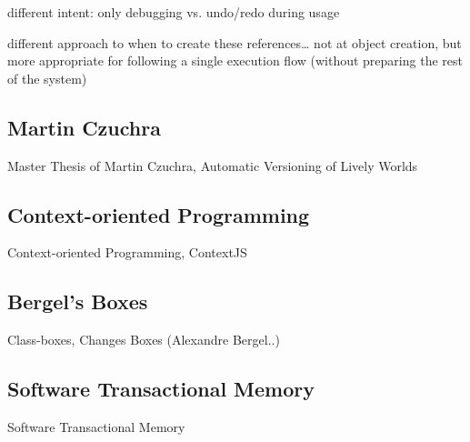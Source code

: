 different intent: only debugging vs. undo/redo during usage

different approach to when to create these references… not at object creation, but more appropriate for following a single execution flow (without preparing the rest of the system)


\subsection{Martin Czuchra}
Master Thesis of Martin Czuchra, Automatic Versioning of Lively Worlds


\subsection{Context-oriented Programming}
Context-oriented Programming, ContextJS


\subsection{Bergel's Boxes}
Class-boxes, Changes Boxes (Alexandre Bergel..)


\subsection{Software Transactional Memory}
Software Transactional Memory